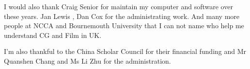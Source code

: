 \begin{acknowledgements}
I would also thank Craig Senior for maintain my computer and software over these years.
Jan Lewis , Dan Cox for the administrating work.
And many more people at NCCA and Bournemouth University that I can not name who help me understand CG and Film in UK.

I’m also thankful to the China Scholar Council for their financial funding and Mr Quanshen Chang and Ms Li Zhu for the administration.
 
 
 
 
 
 
 


\end{acknowledgements}


